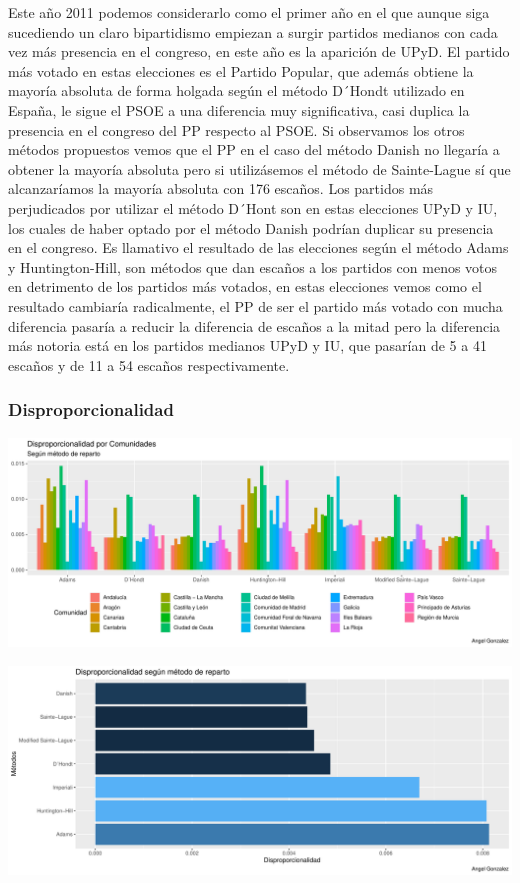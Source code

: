 \documentclass[12pt,a4paper,]{book}
\numberwithin{dummy}{section}
\theoremstyle{ocrenumbox}
\theoremstyle{blacknumex}
\theoremstyle{blacknumbox}
\theoremstyle{ocrenum}
\theoremstyle{ocrenum}
\begin{document}
Este año 2011 podemos considerarlo como el primer año en el que aunque
siga sucediendo un claro bipartidismo empiezan a surgir partidos
medianos con cada vez más presencia en el congreso, en este año es la
aparición de UPyD. El partido más votado en estas elecciones es el
Partido Popular, que además obtiene la mayoría absoluta de forma holgada
según el método D´Hondt utilizado en España, le sigue el PSOE a una
diferencia muy significativa, casi duplica la presencia en el congreso
del PP respecto al PSOE. Si observamos los otros métodos propuestos
vemos que el PP en el caso del método Danish no llegaría a obtener la
mayoría absoluta pero si utilizásemos el método de Sainte-Lague sí que
alcanzaríamos la mayoría absoluta con 176 escaños. Los partidos más
perjudicados por utilizar el método D´Hont son en estas elecciones UPyD
y IU, los cuales de haber optado por el método Danish podrían duplicar
su presencia en el congreso. Es llamativo el resultado de las elecciones
según el método Adams y Huntington-Hill, son métodos que dan escaños a
los partidos con menos votos en detrimento de los partidos más votados,
en estas elecciones vemos como el resultado cambiaría radicalmente, el
PP de ser el partido más votado con mucha diferencia pasaría a reducir
la diferencia de escaños a la mitad pero la diferencia más notoria está
en los partidos medianos UPyD y IU, que pasarían de 5 a 41 escaños y de
11 a 54 escaños respectivamente.

\hypertarget{disproporcionalidad-9}{%
\subsubsection{Disproporcionalidad}\label{disproporcionalidad-9}}

\begin{center}\includegraphics[width=0.95\linewidth]{figurasR/unnamed-chunk-150-1} \end{center}

\begin{center}\includegraphics[width=0.95\linewidth]{figurasR/unnamed-chunk-150-2} \end{center}
\end{document}
